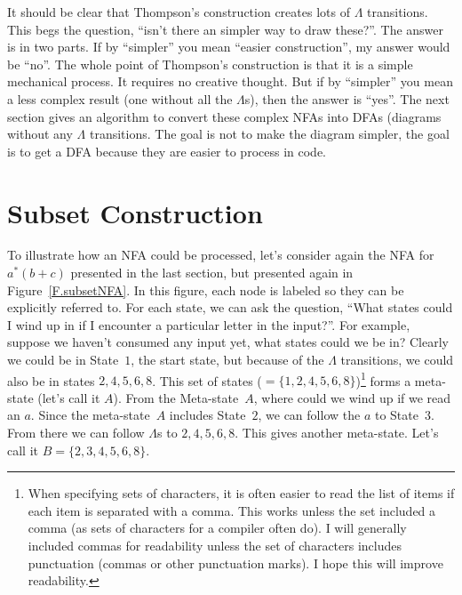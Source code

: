 \documentclass[letterpaper,12pt,openany,reqno]{book}%
\begin{document}
It should be clear that Thompson's construction creates lots of $\Lambda$ transitions. This begs the question, ``isn't there an simpler way to draw these?''. The answer is in two parts. If by ``simpler'' you mean ``easier construction'', my answer would be ``no''. The whole point of Thompson's construction is that it is a simple mechanical process. It requires no creative thought. But if by ``simpler'' you mean a less complex result (one without all the $\Lambda$s), then the answer is ``yes''. The next section gives an algorithm to convert these complex NFAs into DFAs (diagrams without any $\Lambda$ transitions. The goal is not to make the diagram simpler, the goal is to get a DFA because they are easier to process in code.

\section{Subset Construction}\label{S.Subset.Construction}

To illustrate how an NFA could be processed, let's consider again the NFA for $a^* (b + c)$ presented in the last section, but presented again in Figure~\ref{F.subsetNFA}. In this figure, each node is labeled so they can be explicitly referred to. For each state, we can ask the question, ``What states could I wind up in if I encounter a particular letter in the input?''. For example, suppose we haven't consumed any input yet, what states could we be in? Clearly we could be in State~$1$, the start state, but because of the $\Lambda$ transitions, we could also be in states $2, 4, 5, 6, 8$. This set of states ($=\{1, 2, 4, 5, 6, 8\}$)\footnote{When specifying sets of characters,  it is often easier to read the list of items if each item is separated with a comma. This works unless the set included a comma (as sets of characters for a compiler often do). I will generally included commas for readability unless the set of characters includes punctuation (commas or other punctuation marks). I hope this will improve readability.}
forms a meta-state (let's call it $A$). From the Meta-state~$A$, where could we wind up if we read an $a$. Since the meta-state~$A$ includes State~$2$, we can follow the $a$ to State~$3$. From there we can follow $\Lambda$s to $2, 4, 5, 6, 8$. This gives another meta-state. Let's call it $B = \{2, 3, 4, 5, 6, 8\}$. 
\end{document}
